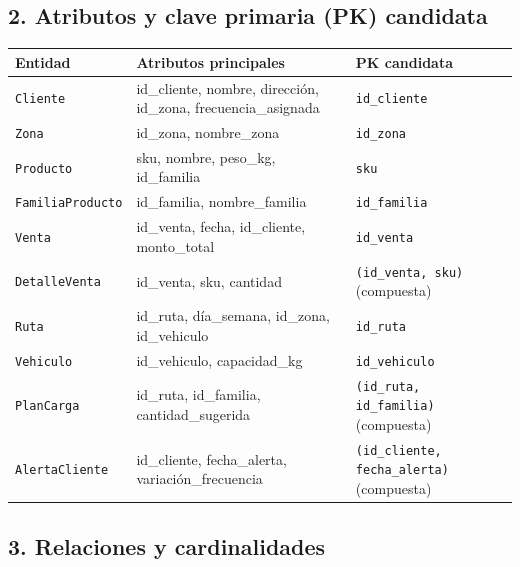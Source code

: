 \documentclass[10pt,a4paper]{article}
\begin{document}
\subsection*{2. Atributos y clave primaria (PK) candidata}

\vspace{0.15cm}
\begin{center}
\small
\renewcommand{\arraystretch}{1.2}
\begin{tabular}{|p{2.8cm}|p{7.6cm}|p{4.3cm}|}
\hline
\textbf{Entidad} & \textbf{Atributos principales} & \textbf{PK candidata} \\ \hline
\texttt{Cliente} & id\_cliente, nombre, dirección, id\_zona, frecuencia\_asignada & \texttt{id\_cliente} \\ \hline
\texttt{Zona} & id\_zona, nombre\_zona & \texttt{id\_zona} \\ \hline
\texttt{Producto} & sku, nombre, peso\_kg, id\_familia & \texttt{sku} \\ \hline
\texttt{FamiliaProducto} & id\_familia, nombre\_familia & \texttt{id\_familia} \\ \hline
\texttt{Venta} & id\_venta, fecha, id\_cliente, monto\_total & \texttt{id\_venta} \\ \hline
\texttt{DetalleVenta} & id\_venta, sku, cantidad & \texttt{(id\_venta, sku)} (compuesta) \\ \hline
\texttt{Ruta} & id\_ruta, día\_semana, id\_zona, id\_vehiculo & \texttt{id\_ruta} \\ \hline
\texttt{Vehiculo} & id\_vehiculo, capacidad\_kg & \texttt{id\_vehiculo} \\ \hline
\texttt{PlanCarga} & id\_ruta, id\_familia, cantidad\_sugerida & \texttt{(id\_ruta, id\_familia)} (compuesta) \\ \hline
\texttt{AlertaCliente} & id\_cliente, fecha\_alerta, variación\_frecuencia & \texttt{(id\_cliente, fecha\_alerta)} (compuesta) \\ \hline
\end{tabular}
\end{center}
\vspace{0.2cm}

\subsection*{3. Relaciones y cardinalidades}
\end{document}
